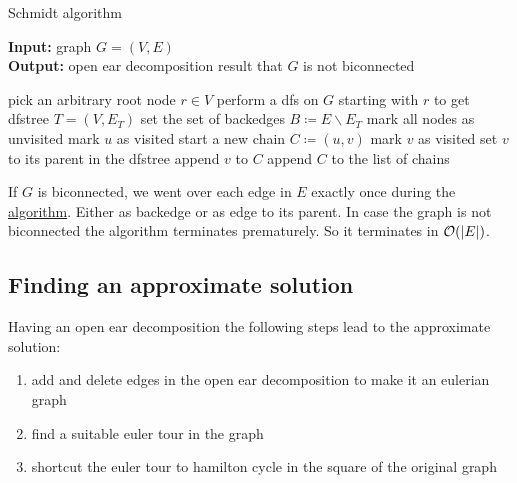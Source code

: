 \begin{algorithm}
  \caption{Schmidt algorithm}\label{alg:schmidt}
  \textbf{Input: } graph \(G = (V, E)\)\\
  \textbf{Output: } open ear decomposition result that \(G\) is not biconnected
  \begin{algorithmic}[1]
      \State pick an arbitrary root node \(r \in V\)
      \State perform a \gls{dfs} on \(G\) starting with \(r\) to get \gls{dfstree} \(T = (V, E_T)\)
        \State{}
      \EndIf
      \State set the set of backedges \(B \coloneqq E \backslash E_T\)
      \State mark all nodes as unvisited
            \State mark \(u\) as visited
            \State start a new chain \(C \coloneqq (u, v)\)
              \State mark \(v\) as visited
              \State set \(v\) to its parent in the \gls{dfstree}
              \State append \(v\) to \(C\)
                \State{}
              \EndIf
            \EndWhile
            \State append \(C\) to the list of chains
          \EndIf
        \EndFor
      \EndFor
          \State{}
        \EndIf
      \EndFor
      \State{}
    \EndProcedure
  \end{algorithmic}
\end{algorithm}

If \(G\) is biconnected, we went over each edge in \(E\) exactly once during the \hyperref[alg:schmidt]{algorithm}. Either as backedge or as edge to its parent. In case the graph is not biconnected the algorithm terminates prematurely. So it terminates in \(\mathcal{O}(\vert E \vert)\).

\subsection{Finding an approximate solution}
Having an open ear decomposition the following steps lead to the approximate solution:
\begin{enumerate}
  \item add and delete edges in the open ear decomposition to make it an eulerian graph
  \item find a suitable euler tour in the graph
  \item shortcut the euler tour to hamilton cycle in the square of the original graph
\end{enumerate}

